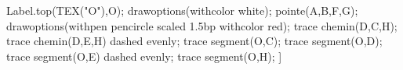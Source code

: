 \begin{corrige}
\begin{enumerate}
\begin{minipage}{0.45\linewidth}
{{                        Label.top(TEX("O"),O);
                        drawoptions(withcolor white);
                        pointe(A,B,F,G);
                        drawoptions(withpen pencircle scaled 1.5bp withcolor red);                
                        trace chemin(D,C,H);
                        trace chemin(D,E,H) dashed evenly;
                        trace segment(O,C);
                        trace segment(O,D);
                        trace segment(O,E) dashed evenly;
                        trace segment(O,H);
                        }
                    ]
                }
        \end{minipage}
    \end{enumerate}
\end{corrige}

